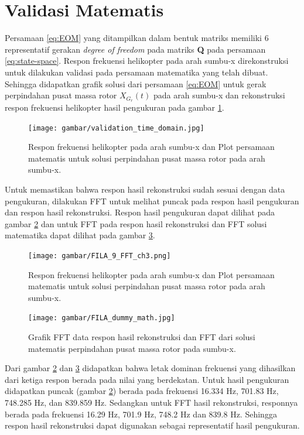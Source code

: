 \section{Validasi Matematis}

Persamaan \ref{eq:EOM} yang ditampilkan dalam bentuk matriks memiliki 6 representatif gerakan \textit{degree of freedom} pada matriks \textbf{Q} pada persamaan \ref{eq:state-space}. Respon frekuensi helikopter pada arah sumbu-x direkonstruksi untuk dilakukan validasi pada persamaan matematika yang telah dibuat. Sehingga didapatkan grafik solusi dari persamaan \ref{eq:EOM} untuk gerak perpindahan pusat massa rotor $X_{G_r}(t)$ pada arah sumbu-x dan rekonstruksi respon frekuensi helikopter hasil pengukuran pada gambar \ref{fig:validation_time_domain}. 

\begin{figure}[H]
	\centering
	\texttt{[image: gambar/validation\_time\_domain.jpg]}
	\caption{Respon frekuensi helikopter pada arah sumbu-x dan Plot persamaan matematis untuk solusi perpindahan pusat massa rotor pada arah sumbu-x.}
	\label{fig:validation_time_domain}
\end{figure}

Untuk memastikan bahwa respon hasil rekonstruksi sudah sesuai dengan data pengukuran, dilakukan FFT untuk melihat puncak pada respon hasil pengukuran dan respon hasil rekonstruksi. Respon hasil pengukuran dapat dilihat pada gambar \ref{fig:FFT_ch3} dan untuk FFT pada respon hasil rekonstruksi dan FFT solusi matematika dapat dilihat pada gambar \ref{fig:FFT_validation}.

\begin{figure}[H]
	\centering
	\texttt{[image: gambar/FILA\_9\_FFT\_ch3.png]}
	\caption{Respon frekuensi helikopter pada arah sumbu-x dan Plot persamaan matematis untuk solusi perpindahan pusat massa rotor pada arah sumbu-x.}
	\label{fig:FFT_ch3}
\end{figure}

\begin{figure}[H]
	\centering
	\texttt{[image: gambar/FILA\_dummy\_math.jpg]}
	\caption{Grafik FFT data respon hasil rekonstruksi dan FFT dari solusi matematis perpindahan pusat massa rotor pada sumbu-x.}
	\label{fig:FFT_validation}
\end{figure}

Dari gambar \ref{fig:FFT_ch3} dan \ref{fig:FFT_validation} didapatkan bahwa letak dominan frekuensi yang dihasilkan dari ketiga respon berada pada nilai yang berdekatan. Untuk hasil pengukuran didapatkan puncak (gambar \ref{fig:FFT_ch3}) berada pada frekuensi 16.334 Hz, 701.83 Hz, 748.285 Hz, dan 839.859 Hz. Sedangkan untuk FFT hasil rekonstruksi, responnya berada pada frekuensi 16.29 Hz, 701.9 Hz, 748.2 Hz dan 839.8 Hz. Sehingga respon hasil rekonstruksi dapat digunakan sebagai representatif hasil pengukuran.

